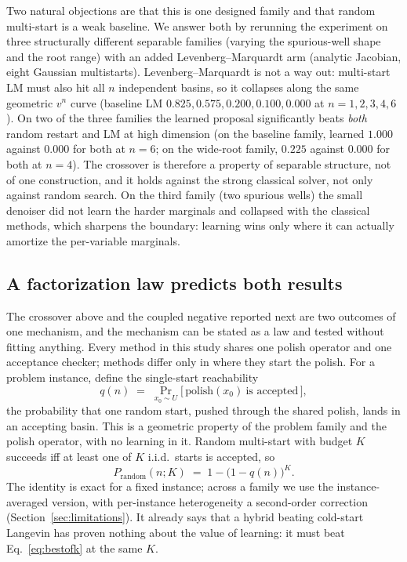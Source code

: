 \documentclass[11pt]{article}
\begin{document}
Two natural objections are that this is one designed family and that random multi-start is a
weak baseline. We answer both by rerunning the experiment on three structurally different
separable families (varying the spurious-well shape and the root range) with an added
Levenberg--Marquardt arm (analytic Jacobian, eight Gaussian multistarts).
Levenberg--Marquardt is not a way out: multi-start LM must also hit all $n$ independent basins,
so it collapses along the same geometric $v^n$ curve (baseline LM $0.825, 0.575, 0.200, 0.100, 0.000$ at
$n = 1, 2, 3, 4, 6$). On two of the three families the learned proposal significantly beats
\emph{both} random restart and LM at high dimension (on the baseline family, learned $1.000$
against $0.000$ for both at $n = 6$; on the wide-root family, $0.225$ against $0.000$ for both at
$n = 4$). The crossover is therefore a property of separable structure, not of one construction,
and it holds against the strong classical solver, not only against random search. On the third
family (two spurious wells) the small denoiser did not learn the harder marginals and collapsed
with the classical methods, which sharpens the boundary: learning wins only where it can actually
amortize the per-variable marginals.

\subsection{A factorization law predicts both results}
\label{sec:law}

The crossover above and the coupled negative reported next are two outcomes of one mechanism,
and the mechanism can be stated as a law and tested without fitting anything. Every method in
this study shares one polish operator and one acceptance checker; methods differ only in where
they start the polish. For a problem instance, define the single-start reachability
\begin{equation}
q(n) \;=\; \Pr_{x_0 \sim U}\big[\,\text{polish}(x_0)\ \text{is accepted}\,\big],
\end{equation}
the probability that one random start, pushed through the shared polish, lands in an accepting
basin. This is a geometric property of the problem family and the polish operator, with no
learning in it. Random multi-start with budget $K$ succeeds iff at least one of $K$ i.i.d.\
starts is accepted, so
\begin{equation}
P_{\text{random}}(n;K) \;=\; 1 - \big(1 - q(n)\big)^{K} .
\label{eq:bestofk}
\end{equation}
The identity is exact for a fixed instance; across a family we use the instance-averaged
version, with per-instance heterogeneity a second-order correction
(Section~\ref{sec:limitations}). It already says that a hybrid beating cold-start Langevin has
proven nothing about the value of learning: it must beat Eq.~\eqref{eq:bestofk} at the same
$K$.
\end{document}
